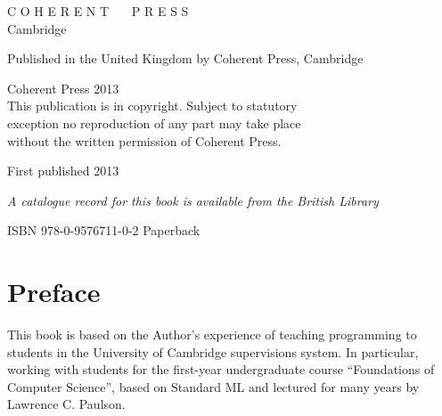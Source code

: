\documentclass[]{book}
\newcommand{\smspace}{\vspace{4mm}}
\begin{document}
\thispagestyle{empty}

{\centering

\vspace{10mm}


\noindent C O H E R E N T \ \ \ P R E S S\\ \vspace{1mm} \footnotesize Cambridge

\vspace{3mm}

\noindent Published in the United Kingdom by Coherent Press, Cambridge

\vspace{3mm}

\noindent {\small \copyright} Coherent Press 2013\\

\vspace{3mm}
\noindent This publication is in copyright. Subject to statutory\\ exception no reproduction of any part may take place\\ without the written permission of Coherent Press.\\

\vspace{3mm}

\noindent First published 2013\\

\vspace{3mm}



\noindent \textit{A catalogue record for this book is available from the British Library}\\

\smspace

\noindent ISBN 978-0-9576711-0-2 Paperback\\

}

\cleardoublepage

\clearpage
\small\pagestyle{empty}{\normalfont\tableofcontents}

\chapter*{Preface}
This book is based on the Author's experience of teaching programming to students in the University of Cambridge supervisions system. In particular, working with students for the first-year undergraduate course ``Foundations of Computer Science'', based on Standard ML and lectured for many years by Lawrence C. Paulson.
\end{document}
